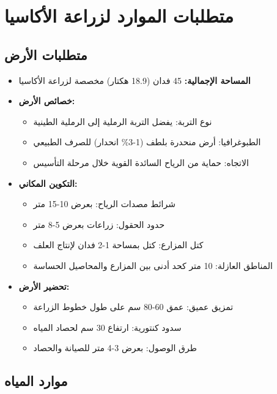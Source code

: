 \section{متطلبات الموارد لزراعة الأكاسيا}

\subsection{متطلبات الأرض}

\begin{itemize}
    \item \textbf{المساحة الإجمالية:} 45 فدان (18.9 هكتار) مخصصة لزراعة الأكاسيا
    \item \textbf{خصائص الأرض:}
    \begin{itemize}
        \item نوع التربة: يفضل التربة الرملية إلى الرملية الطينية
        \item الطبوغرافيا: أرض منحدرة بلطف (1-3\% انحدار) للصرف الطبيعي
        \item الاتجاه: حماية من الرياح السائدة القوية خلال مرحلة التأسيس
    \end{itemize}
    \item \textbf{التكوين المكاني:}
    \begin{itemize}
        \item شرائط مصدات الرياح: بعرض 10-15 متر
        \item حدود الحقول: زراعات بعرض 5-8 متر
        \item كتل المزارع: كتل بمساحة 1-2 فدان لإنتاج العلف
        \item المناطق العازلة: 10 متر كحد أدنى بين المزارع والمحاصيل الحساسة
    \end{itemize}
    \item \textbf{تحضير الأرض:}
    \begin{itemize}
        \item تمزيق عميق: عمق 60-80 سم على طول خطوط الزراعة
        \item سدود كنتورية: ارتفاع 30 سم لحصاد المياه
        \item طرق الوصول: بعرض 3-4 متر للصيانة والحصاد
    \end{itemize}
\end{itemize}

\subsection{موارد المياه}

